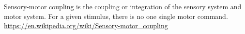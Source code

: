 \documentclass[a4paper]{article}
\title{}
\date{}
\begin{document}
    \maketitle
    Sensory-motor coupling is the coupling or integration of the sensory system and motor system. For a given stimulus, there is no one single motor command. \url{https://en.wikipedia.org/wiki/Sensory-motor_coupling}
\end{document}
